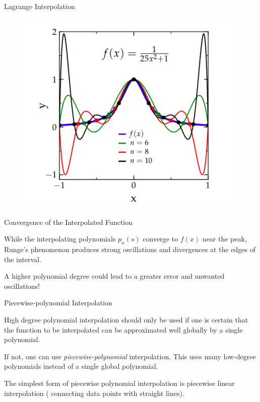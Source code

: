 \documentclass[11pt]{beamer}
\begin{document}
\begin{frame}[fragile]{Lagrange Interpolation}
\begin{figure}
\includegraphics[scale=0.3]{interpolationExample.jpeg}
\end{figure}
\end{frame}


\begin{frame}[fragile]{Convergence of the Interpolated Function}

While the interpolating polynomials $p_n(s)$
converge to $f(x)$ near the peak, Runge's phenomenon produces strong oscillations and
divergences at the edges of the interval.

\bigskip

\pause
A higher polynomial degree could lead to a
greater error and unwanted oscillations!
\end{frame}

\begin{frame}[fragile]{Piecewise-polynomial Interpolation}

High degree polynomial interpolation should only be used
if one is certain that the function to be interpolated can be
approximated well globally by a single polynomial.
\bigskip
\pause

 If not, one can use \emph{piecewise-polynomial} interpolation. This uses
many low-degree polynomials instead of a single global polynomial.
\bigskip
\pause

The simplest form of piecewise polynomial interpolation is piecewise
linear interpolation ( connecting data points with straight
lines).
\end{frame}
\end{document}
